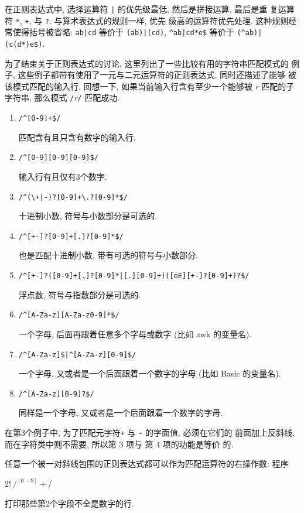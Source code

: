 在正则表达式中, 选择运算符 \verb'|' 的优先级最低, 然后是拼接运算, 最后是重
复运算符 \verb'*', \verb'+', 与 \verb'?'. 与算术表达式的规则一样, 优先
级高的运算符优先处理. 这种规则经常使得括号被省略: \verb'ab|cd' 等价于
\verb'(ab)|(cd)', \verb'^ab|cd*e$' 等价于 \verb'(^ab)|(c(d*)e$)'.

为了结束关于正则表达式的讨论, 这里列出了一些比较有用的字符串匹配模式的
例子, 这些例子都带有使用了一元与二元运算符的正则表达式, 同时还描述了能够
被该模式匹配的输入行. 回想一下, 如果当前输入行含有至少一个能够被
\textit{r} 匹配的子字符串, 那么模式 \verb'/'\textit{r}\verb'/'
匹配成功.
\begin{enumerate}
\item[] \verb'/^[0-9]+$/' \par
    \qquad 匹配含有且只含有数字的输入行.
\item[] \verb'/^[0-9][0-9][0-9]$/' \par
    \qquad 输入行有且仅有3个数字.
\item[] \verb'/^(\+|-)?[0-9]+\.?[0-9]*$/' \par
    \qquad 十进制小数, 符号与小数部分是可选的.
\item[] \verb'/^[+-]?[0-9]+[.]?[0-9]*$/' \par
    \qquad 也是匹配十进制小数, 带有可选的符号与小数部分.
\item[] \verb'/^[+-]?([0-9]+[.]?[0-9]*|[.][0-9]+)([eE][+-]?[0-9]+)?$/' \par
    \qquad 浮点数, 符号与指数部分是可选的.
\item[] \verb'/^[A-Za-z][A-Za-z0-9]*$/' \par
    \qquad 一个字母, 后面再跟着任意多个字母或数字 (比如 awk 的变量名).
\item[] \verb'/^[A-Za-z]$|^[A-Za-z][0-9]$/' \par
    \qquad 一个字母, 又或者是一个后面跟着一个数字的字母 (比如 Basic 的变量名).
\item[] \verb'/^[A-Za-z][0-9]?$/' \par
    \qquad 同样是一个字母, 又或者是一个后面跟着一个数字的字母.
\end{enumerate}
在第3个例子中, 为了匹配元字符\verb'+' 与 \verb'-' 的字面值, 必须在它们的
前面加上反斜线, 而在字符类中则不需要, 所以第 3 项与 第 4 项的功能是等价
的.

任意一个被一对斜线包围的正则表达式都可以作为匹配运算符的右操作数: 程序
\begin{myverb}
    $2 !~ /^[0-9]+$/
\end{myverb}
打印那些第2个字段不全是数字的行.

